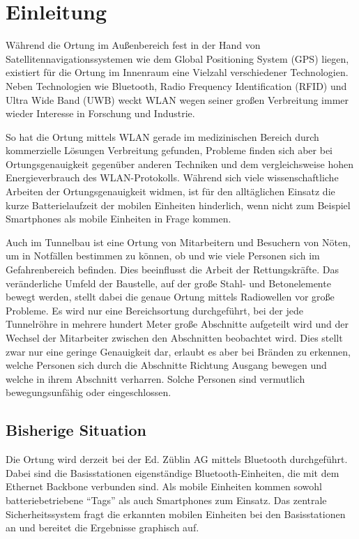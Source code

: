 \chapter{Einleitung}
\label{ch:Einleitung}
Während die Ortung im Außenbereich fest in der Hand von Satellitennavigationssystemen wie dem Global Positioning System (GPS) liegen, existiert für die Ortung im Innenraum eine Vielzahl verschiedener Technologien. Neben Technologien wie Bluetooth, Radio Frequency Identification (RFID) und Ultra Wide Band (UWB) weckt WLAN wegen seiner großen Verbreitung immer wieder Interesse in Forschung und Industrie. 

So hat die Ortung mittels WLAN gerade im medizinischen Bereich durch kommerzielle Lösungen Verbreitung gefunden, Probleme finden sich aber bei Ortungsgenauigkeit gegenüber anderen Techniken und dem vergleichsweise hohen Energieverbrauch des WLAN-Protokolls.
Während sich viele wissenschaftliche Arbeiten der Ortungsgenauigkeit widmen, ist für den alltäglichen Einsatz die kurze Batterielaufzeit der mobilen Einheiten hinderlich, wenn nicht zum Beispiel Smartphones als mobile Einheiten in Frage kommen. 

Auch im Tunnelbau ist eine Ortung von Mitarbeitern und Besuchern von Nöten, um in Notfällen bestimmen zu können, ob und wie viele Personen sich im Gefahrenbereich befinden. 
Dies beeinflusst die Arbeit der Rettungskräfte. 
Das veränderliche Umfeld der Baustelle, auf der große Stahl- und Betonelemente bewegt werden, stellt dabei die genaue Ortung mittels Radiowellen vor große Probleme.
Es wird nur eine Bereichsortung durchgeführt, bei der jede Tunnelröhre in mehrere hundert Meter große Abschnitte aufgeteilt wird und der Wechsel der Mitarbeiter zwischen den Abschnitten beobachtet wird. 
Dies stellt zwar nur eine geringe Genauigkeit dar, erlaubt es aber bei Bränden zu erkennen, welche Personen sich durch die Abschnitte Richtung Ausgang bewegen und welche in ihrem Abschnitt verharren. 
Solche Personen sind vermutlich bewegungsunfähig oder eingeschlossen.


\section{Bisherige Situation}
Die Ortung wird derzeit bei der Ed. Züblin AG mittels Bluetooth durchgeführt. 
Dabei sind die Basisstationen eigenständige Bluetooth-Einheiten, die mit dem Ethernet Backbone verbunden sind.
Als mobile Einheiten kommen sowohl batteriebetriebene "`Tags"' als auch Smartphones zum Einsatz. 
Das zentrale Sicherheitssystem fragt die erkannten mobilen Einheiten bei den Basisstationen an und bereitet die Ergebnisse graphisch auf.

